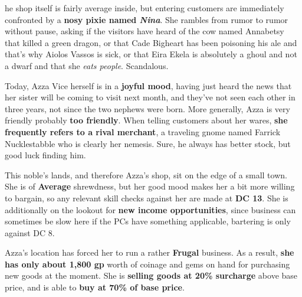 \documentclass[10pt,a4paper,twoside,bg=print,twocolumn,openany,nodeprecatedcode]{dndbook}
\begin{document}
he shop itself is fairly average inside, but entering customers are immediately confronted by a \textbf{nosy pixie named \textit{Nina}}. She rambles from rumor to rumor without pause, asking if the visitors have heard of the cow named Annabetsy that killed a green dragon, or that Cade Bigheart has been poisoning his ale and that's why Aiolos Vassos is sick, or that Eira Ekela is absolutely a ghoul and not a dwarf and that she \textit{eats people}. Scandalous.


Today, Azza Vice herself is in a \textbf{joyful mood}, having just heard the news that her sister will be coming to visit next month, and they've not seen each other in three years, not since the two nephews were born. More generally, Azza is very friendly probably \textbf{too friendly}. When telling customers about her wares, \textbf{she frequently refers to a rival merchant}, a traveling gnome named Farrick Nucklestabble who is clearly her nemesis. Sure, he always has better stock, but good luck finding him.

This noble's lands, and therefore Azza's shop, sit on the edge of a small town. She is of \textbf{Average} shrewdness, but her good mood makes her a bit more willing to bargain, so any relevant skill checks against her are made at \textbf{DC 13}. She is additionally on the lookout for \textbf{new income opportunities}, since business can sometimes be slow here if the PCs have something applicable, bartering is only against DC 8.

Azza's location has forced her to run a rather \textbf{Frugal} business. As a result, \textbf{she has only about 1,800 gp} worth of coinage and gems on hand for purchasing new goods at the moment. She is \textbf{selling goods at 20\% surcharge} above base price, and is able to \textbf{buy at 70\% of base price}.
\end{document}
